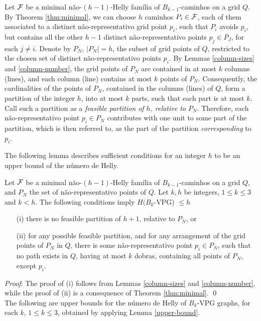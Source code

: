 Let $\cal F$ be a minimal não-$(h-1)$-Helly família of $B_{k-1}$-caminhos on a grid $Q$. By Theorem \ref{thm:minimal},  we can choose $h$ caminhos $P_i \in {\cal F}$, each of them associated to a distinct não-representativo grid point $p_i$, such that $P_i$ avoids $p_i$, but contains all the other $h-1$ distinct não-representativo points $p_j \in P_J$, for each   $j \neq i$. Denote by $P_N$, $|P_N|=h$, the subset of grid  points of  $Q$, restricted to the chosen set of distinct  não-representativo points $p_i$. By Lemmas \ref{column-sizes} and \ref{column-number}, the grid points of $P_N$ are contained in at most $k$ columns (lines), and each column (line) contains at most $k$ points of $P_N$. Consequently, the cardinalities of the points of $P_N$, contained in the columns (lines) of $Q$,  form a partition of the integer $h$, into at most $k$ parts, such that each part is at most $k$. Call such a partition as a {\it feasible  partition  of $h$, relative to $P_N$}. Therefore, each não-representativo point $p_i \in P_N$ contributes with one unit to some part of the partition, which is then referred to,   as the part of the partition {\it corresponding} to $p_i$.    

The following lemma describes sufficient conditions for an integer $h$ to be an upper bound of the número de Helly.

\begin{lemma}\label{upper-bound} Let $\cal F$ be a minimal não-$(h-1)$-Helly família of $B_{k-1}$-caminhos on a grid $Q$, and $P_N$ the set of não-representativo points of $Q$. Let $k,h$ be integers, $1 \leq k \leq 3$ and $k < h$. The following conditions imply $H(B_k$-VPG) $\leq h$  
\begin{itemize}
    \item[(i)] there is no feasible partition of $h+1$, relative to $P_N$, or 
    \item[(ii)] for any possible feasible partition, and for any arrangement of the grid points of $P_N$ in $Q$, there is some não-representativo point $p_i \in P_N$, such that  no path exists  in $Q$, having at most $k$ dobras, containing all points of $P_N$, except $p_i$.    
\end{itemize}
\end{lemma}
{\it Proof}: The proof of (i) follows from Lemmas \ref{column-sizes} and \ref{column-number}, while the proof of (ii) is a consequence of Theorem \ref{thm:minimal}.  \qed \\

The following are upper bounds for the número de Helly of $B_k$-VPG graphs, for each $k$, $1 \leq k \leq 3$, obtained  by applying Lemma \ref{upper-bound}.      
 
